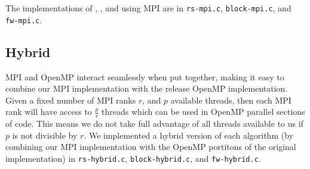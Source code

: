 The implementations of \rs{}, \block{}, and \fw{} using MPI are in
\texttt{rs-mpi.c}, \texttt{block-mpi.c}, and \texttt{fw-mpi.c}.

\subsection{Hybrid}
MPI and OpenMP interact seamlessly when put together, making it easy to combine
our MPI implementation with the release OpenMP implementation. Given a fixed
number of MPI ranks $r$, and $p$ available threads, then each MPI rank will
have access to $\frac{p}{r}$ threads which can be used in OpenMP parallel
sections of code. This means we do not take full advantage of all threads
available to us if $p$ is not divisible by $r$. We implemented a hybrid version
of each algorithm (by combining our MPI implementation with the OpenMP
portitons of the original implementation) in \texttt{rs-hybrid.c},
\texttt{block-hybrid.c}, and \texttt {fw-hybrid.c}.
